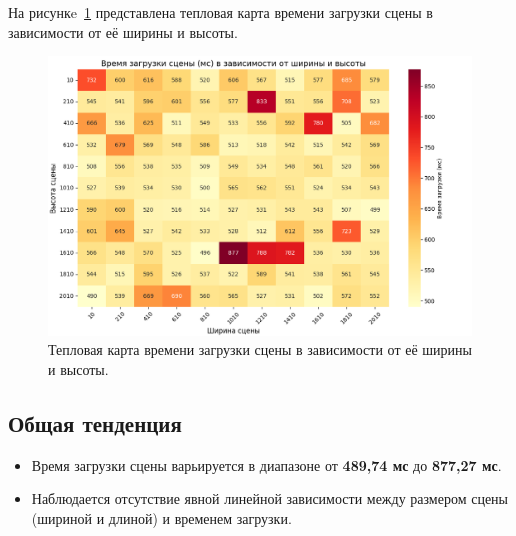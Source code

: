 На рисункe~\ref{images:graph_3} представлена тепловая карта времени загрузки сцены в зависимости от её ширины и высоты.
\begin{figure}[H]
    \centering
    \includegraphics[width=155mm]{images/graph_3}
    \caption{Тепловая карта времени загрузки сцены в зависимости от её ширины и высоты.}
    \label{images:graph_3}
\end{figure}


\subsection{Общая тенденция}
\begin{itemize}
    \item Время загрузки сцены варьируется в диапазоне от \textbf{489,74 мс} до \textbf{877,27 мс}.
    \item Наблюдается отсутствие явной линейной зависимости между размером сцены (шириной и длиной) и временем загрузки.
\end{itemize}

